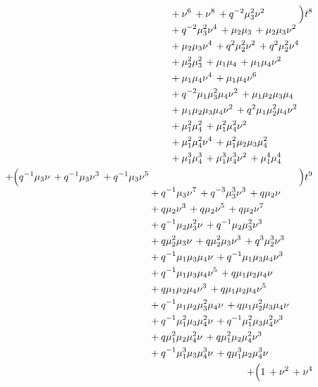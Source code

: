 \documentclass[10pt]{article}
\begin{document}
\[\begin{aligned}
\begin{aligned}[t]
  &{}+\nu^{6}\,+\nu^{8}\,+q^{-2}\mu_3^{2}\nu^{2} \\
  &{}+q^{-2}\mu_3^{2}\nu^{4}\,+\mu_2\mu_3\,+\mu_2\mu_3\nu^{2} \\
  &{}+\mu_2\mu_3\nu^{4}\,+q^{2}\mu_2^{2}\nu^{2}\,+q^{2}\mu_2^{2}\nu^{4} \\
  &{}+\mu_2^{2}\mu_3^{2}\,+\mu_1\mu_4\,+\mu_1\mu_4\nu^{2} \\
  &{}+\mu_1\mu_4\nu^{4}\,+\mu_1\mu_4\nu^{6} \\
  &{}+q^{-2}\mu_1\mu_3^{2}\mu_4\nu^{2}\,+\mu_1\mu_2\mu_3\mu_4 \\
  &{}+\mu_1\mu_2\mu_3\mu_4\nu^{2}\,+q^{2}\mu_1\mu_2^{2}\mu_4\nu^{2} \\
  &{}+\mu_1^{2}\mu_4^{2}\,+\mu_1^{2}\mu_4^{2}\nu^{2} \\
  &{}+\mu_1^{2}\mu_4^{2}\nu^{4}\,+\mu_1^{2}\mu_2\mu_3\mu_4^{2} \\
  &{}+\mu_1^{3}\mu_4^{3}\,+\mu_1^{3}\mu_4^{3}\nu^{2}\,+\mu_1^{4}\mu_4^{4}\end{aligned}\Bigr)t^{8} \\
  + \Bigl(\begin{aligned}[t]q^{-1}\mu_3\nu\,+q^{-1}\mu_3\nu^{3}\,+q^{-1}\mu_3\nu^{5} \\
  &{}+q^{-1}\mu_3\nu^{7}\,+q^{-3}\mu_3^{3}\nu^{3}\,+q\mu_2\nu \\
  &{}+q\mu_2\nu^{3}\,+q\mu_2\nu^{5}\,+q\mu_2\nu^{7} \\
  &{}+q^{-1}\mu_2\mu_3^{2}\nu\,+q^{-1}\mu_2\mu_3^{2}\nu^{3} \\
  &{}+q\mu_2^{2}\mu_3\nu\,+q\mu_2^{2}\mu_3\nu^{3}\,+q^{3}\mu_2^{3}\nu^{3} \\
  &{}+q^{-1}\mu_1\mu_3\mu_4\nu\,+q^{-1}\mu_1\mu_3\mu_4\nu^{3} \\
  &{}+q^{-1}\mu_1\mu_3\mu_4\nu^{5}\,+q\mu_1\mu_2\mu_4\nu \\
  &{}+q\mu_1\mu_2\mu_4\nu^{3}\,+q\mu_1\mu_2\mu_4\nu^{5} \\
  &{}+q^{-1}\mu_1\mu_2\mu_3^{2}\mu_4\nu\,+q\mu_1\mu_2^{2}\mu_3\mu_4\nu \\
  &{}+q^{-1}\mu_1^{2}\mu_3\mu_4^{2}\nu\,+q^{-1}\mu_1^{2}\mu_3\mu_4^{2}\nu^{3} \\
  &{}+q\mu_1^{2}\mu_2\mu_4^{2}\nu\,+q\mu_1^{2}\mu_2\mu_4^{2}\nu^{3} \\
  &{}+q^{-1}\mu_1^{3}\mu_3\mu_4^{3}\nu\,+q\mu_1^{3}\mu_2\mu_4^{3}\nu\end{aligned}\Bigr)t^{9} \\
  + \Bigl(\begin{aligned}[t]1\,+\nu^{2}\,+\nu^{4} \\

\end{aligned}
\end{aligned}\]
\end{document}
